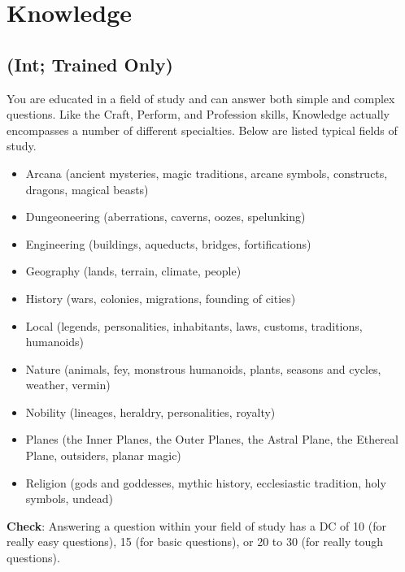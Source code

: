 \section{Knowledge}

\label{f0}
\subsection{(Int; Trained Only)}

				
You are educated in a field of study and can answer both simple and complex questions. Like the Craft, Perform, and Profession skills, Knowledge actually encompasses a number of different specialties. Below are listed typical fields of study.
				\begin{itemize}\item  Arcana (ancient mysteries, magic traditions, arcane symbols, constructs, dragons, magical beasts)
				\item  Dungeoneering (aberrations, caverns, oozes, spelunking)
				\item  Engineering (buildings, aqueducts, bridges, fortifications)
				\item  Geography (lands, terrain, climate, people)
				\item  History (wars, colonies, migrations, founding of cities)
				\item  Local (legends, personalities, inhabitants, laws, customs, traditions, humanoids)
				\item  Nature (animals, fey, monstrous humanoids, plants, seasons and cycles, weather, vermin)
				\item  Nobility (lineages, heraldry, personalities, royalty)
				\item  Planes (the Inner Planes, the Outer Planes, the Astral Plane, the Ethereal Plane, outsiders, planar magic)
				\item  Religion (gods and goddesses, mythic history, ecclesiastic tradition, holy symbols, undead)
\end{itemize}
				
\textbf{Check}: Answering a question within your field of study has a DC of 10 (for really easy questions), 15 (for basic questions), or 20 to 30 (for really tough questions).
				
